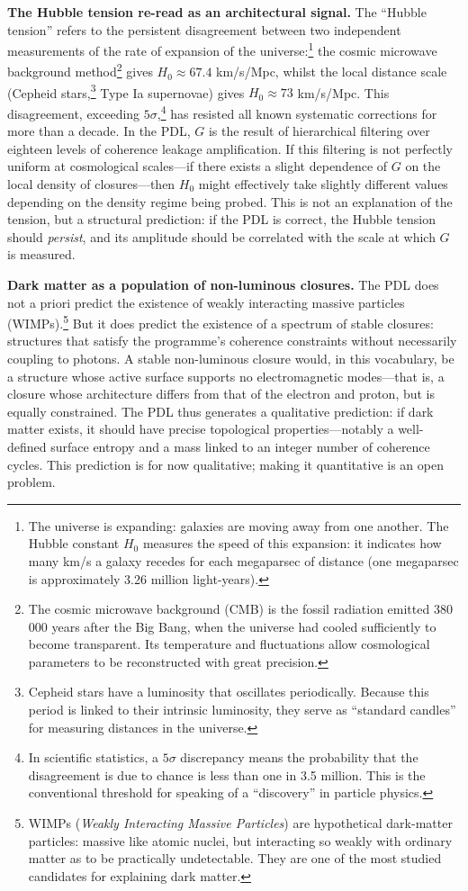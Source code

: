 \documentclass[12pt, a4paper, openright]{book}
\begin{document}
\textbf{The Hubble tension re-read as an architectural signal.} The ``Hubble tension'' refers to the persistent disagreement between two independent measurements of the rate of expansion of the universe:\footnote{The universe is expanding: galaxies are moving away from one another. The Hubble constant $H_0$ measures the speed of this expansion: it indicates how many km/s a galaxy recedes for each megaparsec of distance (one megaparsec is approximately 3.26 million light-years).} the cosmic microwave background method\footnote{The cosmic microwave background (CMB) is the fossil radiation emitted 380\,000 years after the Big Bang, when the universe had cooled sufficiently to become transparent. Its temperature and fluctuations allow cosmological parameters to be reconstructed with great precision.} gives $H_0 \approx 67.4$ km/s/Mpc, whilst the local distance scale (Cepheid stars,\footnote{Cepheid stars have a luminosity that oscillates periodically. Because this period is linked to their intrinsic luminosity, they serve as ``standard candles'' for measuring distances in the universe.} Type Ia supernovae) gives $H_0 \approx 73$ km/s/Mpc. This disagreement, exceeding $5\sigma$,\footnote{In scientific statistics, a $5\sigma$ discrepancy means the probability that the disagreement is due to chance is less than one in 3.5 million. This is the conventional threshold for speaking of a ``discovery'' in particle physics.} has resisted all known systematic corrections for more than a decade. In the PDL, $G$ is the result of hierarchical filtering over eighteen levels of coherence leakage amplification. If this filtering is not perfectly uniform at cosmological scales---if there exists a slight dependence of $G$ on the local density of closures---then $H_0$ might effectively take slightly different values depending on the density regime being probed. This is not an explanation of the tension, but a structural prediction: if the PDL is correct, the Hubble tension should \emph{persist}, and its amplitude should be correlated with the scale at which $G$ is measured.

\medskip

\textbf{Dark matter as a population of non-luminous closures.} The PDL does not a priori predict the existence of weakly interacting massive particles (WIMPs).\footnote{WIMPs (\textit{Weakly Interacting Massive Particles}) are hypothetical dark-matter particles: massive like atomic nuclei, but interacting so weakly with ordinary matter as to be practically undetectable. They are one of the most studied candidates for explaining dark matter.} But it does predict the existence of a spectrum of stable closures: structures that satisfy the programme's coherence constraints without necessarily coupling to photons. A stable non-luminous closure would, in this vocabulary, be a structure whose active surface supports no electromagnetic modes---that is, a closure whose architecture differs from that of the electron and proton, but is equally constrained. The PDL thus generates a qualitative prediction: if dark matter exists, it should have precise topological properties---notably a well-defined surface entropy and a mass linked to an integer number of coherence cycles. This prediction is for now qualitative; making it quantitative is an open problem.
\end{document}
